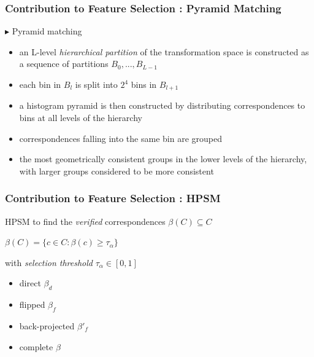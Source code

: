 \documentclass[11pt]{beamer}
\begin{document}
\begin{frame}
\frametitle{Contribution to Feature Selection : Pyramid Matching}

$\blacktriangleright$ Pyramid matching
\begin{itemize}
\item an L-level \textit{hierarchical partition} of the transformation space is constructed as a sequence of partitions $B_0, ..., B_{L-1}$
\item each bin in $B_l$ is split into $2^4$ bins in $B_{l+1}$
\item a histogram pyramid is then constructed by distributing correspondences to bins at all levels of the hierarchy
\item correspondences falling into the same bin are grouped
\item the most geometrically consistent groups in the lower levels of the hierarchy, with larger groups considered to be more consistent
\end{itemize}
\end{frame}


\begin{frame}
\frametitle{Contribution to Feature Selection : HPSM}

HPSM to find the \textit{verified} correspondences $\beta(C) \subseteq C$
\begin{center}
$\beta(C) = \{c \in C : \beta(c) \geq \tau_\alpha \}$
\end{center}

with \textit{selection threshold} $\tau_\alpha \in [0, 1]$

\begin{itemize}
\item direct $\beta_d$
\item flipped $\beta_f$
\item back-projected $\beta'_f$
\item complete $\beta$

\end{itemize}
\end{frame}
\end{document}
